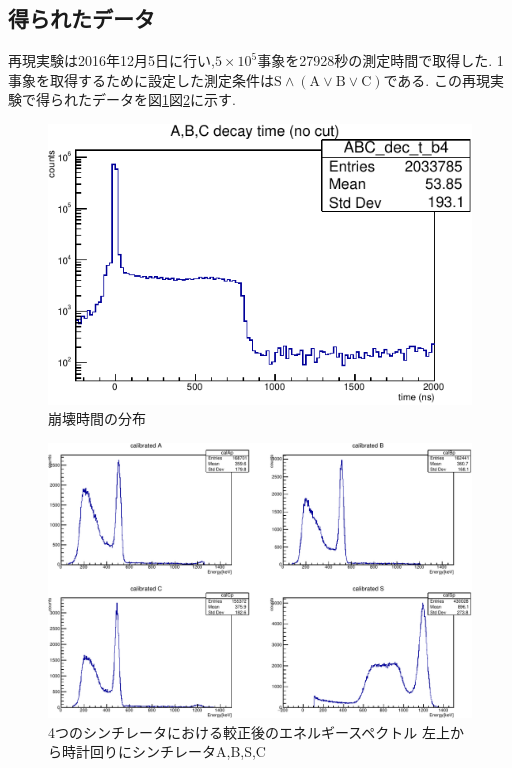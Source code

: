 \subsection{得られたデータ}
再現実験は2016年12月5日に行い,$5\times 10^{5}$事象を27928秒の測定時間で取得した.
1事象を取得するために設定した測定条件は\hspace{8pt}$\textrm{S}\land(\textrm{A}\lor \textrm{B}\lor \textrm{C})$である.
この再現実験で得られたデータを図\ref{fig:dec_t_b4}図\ref{fig:calibrated9075}に示す.
\begin{figure}[H]
	\centering
		\includegraphics[width=12cm]{fig/isb/decay_t.pdf}
		\caption{崩壊時間の分布}
		\label{fig:dec_t_b4}
\end{figure}

\begin{figure}[H]
	\centering
	\includegraphics[width=15cm]{fig/isb/cal_9075.pdf}
	\caption{4つのシンチレータにおける較正後のエネルギースペクトル \newline 左上から時計回りにシンチレータA,B,S,C}
	\label{fig:calibrated9075}
\end{figure}

